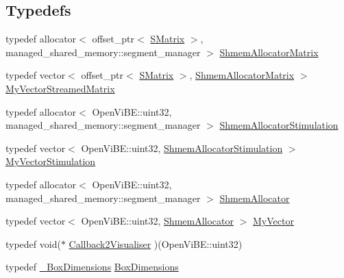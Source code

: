 \subsection*{Typedefs}
\begin{DoxyCompactItemize}
\item 
typedef allocator$<$ offset\_\-ptr$<$ \hyperlink{structOpenViBEApplications_1_1SMatrix}{SMatrix} $>$, managed\_\-shared\_\-memory::segment\_\-manager $>$ \hyperlink{namespaceOpenViBEApplications_a3ea9362fb7313956afc9130a80eb0078}{ShmemAllocatorMatrix}
\item 
typedef vector$<$ offset\_\-ptr$<$ \hyperlink{structOpenViBEApplications_1_1SMatrix}{SMatrix} $>$, \hyperlink{namespaceOpenViBEApplications_a3ea9362fb7313956afc9130a80eb0078}{ShmemAllocatorMatrix} $>$ \hyperlink{namespaceOpenViBEApplications_a49e9170dae207ef828da8396979a89da}{MyVectorStreamedMatrix}
\item 
typedef allocator$<$ OpenViBE::uint32, managed\_\-shared\_\-memory::segment\_\-manager $>$ \hyperlink{namespaceOpenViBEApplications_a5ea079d882839a99bd5c76715c9a450d}{ShmemAllocatorStimulation}
\item 
typedef vector$<$ OpenViBE::uint32, \hyperlink{namespaceOpenViBEApplications_a5ea079d882839a99bd5c76715c9a450d}{ShmemAllocatorStimulation} $>$ \hyperlink{namespaceOpenViBEApplications_a76138bc86fc2d1d552722e25bdcaf890}{MyVectorStimulation}
\item 
typedef allocator$<$ OpenViBE::uint32, managed\_\-shared\_\-memory::segment\_\-manager $>$ \hyperlink{namespaceOpenViBEApplications_afda96459860c5ef7c820d01b5ce03bb0}{ShmemAllocator}
\item 
typedef vector$<$ OpenViBE::uint32, \hyperlink{namespaceOpenViBEApplications_afda96459860c5ef7c820d01b5ce03bb0}{ShmemAllocator} $>$ \hyperlink{namespaceOpenViBEApplications_a190a1df7f170704bb87c3b1cc3df3641}{MyVector}
\item 
typedef void($\ast$ \hyperlink{namespaceOpenViBEApplications_a3cd8eac2f1ee289a3a5a2fda466ffc97}{Callback2Visualiser} )(OpenViBE::uint32)
\item 
typedef \hyperlink{structOpenViBEApplications_1_1__BoxDimensions}{\_\-BoxDimensions} \hyperlink{namespaceOpenViBEApplications_a0eb6bc715238261bf0c5408643a50708}{BoxDimensions}
\end{DoxyCompactItemize}
